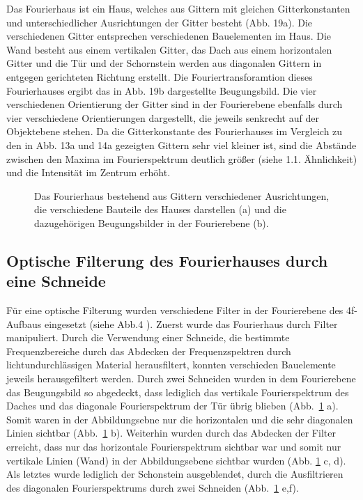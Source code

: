 Das Fourierhaus ist ein Haus, welches aus Gittern mit gleichen Gitterkonstanten und unterschiedlicher Ausrichtungen der Gitter besteht (Abb. 19a). Die verschiedenen Gitter entsprechen verschiedenen Bauelementen im Haus. Die Wand besteht aus einem vertikalen Gitter, das Dach aus einem horizontalen Gitter und die Tür und der Schornstein werden aus diagonalen Gittern in entgegen gerichteten Richtung erstellt. Die Fouriertransforamtion dieses
Fourierhauses ergibt das in Abb. 19b dargestellte Beugungsbild. Die vier verschiedenen Orientierung der Gitter sind in der Fourierebene ebenfalls durch vier verschiedene Orientierungen dargestellt, die jeweils senkrecht auf der Objektebene stehen. Da die Gitterkonstante des Fourierhauses im Vergleich zu den in Abb. 13a und 14a gezeigten Gittern sehr viel kleiner ist, sind die Abstände zwischen den Maxima im Fourierspektrum deutlich größer (siehe 1.1. Ähnlichkeit) und die Intensität im Zentrum erhöht.

\begin{figure}[h]
	\centering
	\caption[Fourierhaus mit Fourierspektrum]{
		Das Fourierhaus   bestehend aus Gittern verschiedener Ausrichtungen, die 	verschiedene Bauteile des Hauses darstellen (a) und die dazugehörigen Beugungsbilder in der Fourierebene (b).
	}
	\label{fig:fourierhaus_und_spektrum}
\end{figure}

\subsection{Optische Filterung des Fourierhauses durch eine Schneide}

Für eine optische Filterung wurden verschiedene Filter in der Fourierebene des 4f-Aufbaus eingesetzt (siehe Abb.4%
). Zuerst wurde das Fourierhaus durch Filter manipuliert. Durch die Verwendung einer Schneide, die bestimmte Frequenzbereiche durch das Abdecken der Frequenzspektren durch lichtundurchlässigen Material herausfiltert, konnten verschieden Bauelemente jeweils herausgefiltert werden. Durch zwei Schneiden wurden in dem
Fourierebene das Beugungsbild so abgedeckt, dass lediglich das vertikale Fourierspektrum des Daches und das diagonale Fourierspektrum der Tür übrig blieben (Abb.~\ref{fig:fourierhaus_und_spektrum} a). Somit waren
in der Abbildungsebne nur die horizontalen und die sehr diagonalen Linien sichtbar (Abb.~\ref{fig:fourierhaus_und_spektrum} b). Weiterhin wurden durch das Abdecken der Filter erreicht, dass nur das horizontale Fourierspektrum sichtbar war und somit nur vertikale Linien (Wand) in der Abbildungsebene
sichtbar wurden (Abb. \ref{fig:fourierhaus_und_spektrum} c, d). Als letztes wurde lediglich der Schonstein ausgeblendet, durch die Ausfiltrieren des diagonalen Fourierspektrums durch zwei Schneiden (Abb.~\ref{fig:fourierhaus_und_spektrum} e,f).

